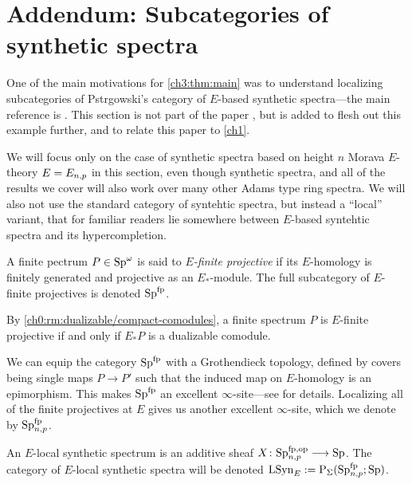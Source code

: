 
\section{Addendum: Subcategories of synthetic spectra}
\label{ch3:addendum}

One of the main motivations for \cref{ch3:thm:main} was to understand localizing subcategories of Pstr\a{}gowski's category of $E$-based synthetic spectra---the main reference is \cite{pstragowski_2022}. This section is not part of the paper \cite{aambo_2024_localizing}, but is added to flesh out this example further, and to relate this paper to \cref{ch1}. 

We will focus only on the case of synthetic spectra based on height $n$ Morava $E$-theory $E=E_{n,p}$ in this section, even though synthetic spectra, and all of the results we cover will also work over many other Adams type ring spectra. We will also not use the standard category of syntehtic spectra, but instead a ``local'' variant, that for familiar readers lie somewhere between $E$-based syntehtic spectra and its hypercompletion. 

\begin{definition}
    A finite pectrum $P\in \mathrm{Sp}^\omega$ is said to \emph{$E$-finite projective} if its $E$-homology is finitely generated and projective as an $E_{*}$-module. The full subcategory of $E$-finite projectives is denoted $\mathrm{Sp}^{\mathrm{fp}}$. 
\end{definition}

\begin{remark}
    By \cref{ch0:rm:dualizable/compact-comodules}, a finite spectrum $P$ is $E$-finite projective if and only if $E_{*}P$ is a dualizable comodule. 
\end{remark}

We can equip the category $\mathrm{Sp}^{\mathrm{fp}}$ with a Grothendieck topology, defined by covers being single maps $P\to P'$ such that the induced map on $E$-homology is an epimorphism. This makes $\mathrm{Sp}^{\mathrm{fp}}$ an excellent $\infty$-site---see \cite[Section 2.3]{pstragowski_2022} for details. Localizing all of the finite projectives at $E$ gives us another excellent $\infty$-site, which we denote by $\mathrm{Sp}_{n,p}^{\mathrm{fp}}$. 

\begin{definition}
    An $E$-local synthetic spectrum is an additive sheaf $X\colon \mathrm{Sp}_{n,p}^{\mathrm{fp}, \mathrm{op}}\longrightarrow \mathrm{Sp}$. The category of $E$-local synthetic spectra will be denoted $\mathrm{LSyn}_{E} := \mathrm{P}_\Sigma(\mathrm{Sp}_{n,p}^{\mathrm{fp}};\mathrm{Sp})$. 
\end{definition}

